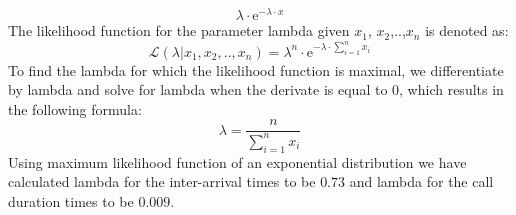 \documentclass[12pt,a4paper]{article}
\begin{document}
\begin{equation} \lambda\cdot\mathrm{e}^{-\lambda\cdot x} \end{equation}
The likelihood function for the parameter lambda given $x_1$, $x_2$,..,$x_n$ is denoted as:
\begin{equation} \mathcal{L}(\lambda|x_1, x_2,..,x_n) = \lambda^{n}\cdot\mathrm{e}^{-\lambda\cdot \sum_{i=1}^{n} x_i} \end{equation}
To find the lambda for which the likelihood function is maximal, we differentiate by lambda and solve for lambda when the derivate is equal to 0, which results in the following formula:
\begin{equation} \lambda=\dfrac{n}{\sum_{i=1}^{n} x_i} \end{equation}
Using maximum likelihood function of an exponential distribution we have calculated lambda for the inter-arrival times to be $0.73$ and lambda for the call duration times to be $0.009$.
\end{document}

